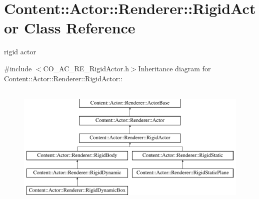 \hypertarget{classContent_1_1Actor_1_1Renderer_1_1RigidActor}{
\section{Content::Actor::Renderer::RigidActor Class Reference}
\label{classContent_1_1Actor_1_1Renderer_1_1RigidActor}
}


rigid actor  


{\ttfamily \#include $<$CO\_\-AC\_\-RE\_\-RigidActor.h$>$}Inheritance diagram for Content::Actor::Renderer::RigidActor::\begin{figure}[H]
\begin{center}
\leavevmode
\includegraphics[height=6cm]{classContent_1_1Actor_1_1Renderer_1_1RigidActor}
\end{center}
\end{figure}

